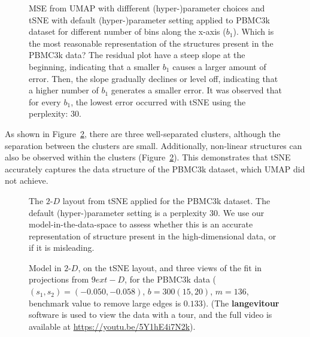 \documentclass[
  12pt]{article}
\begin{document}
\begin{figure}[H]


\caption{\label{fig-pbmc-mse}MSE from UMAP with diffferent
(hyper-)parameter choices and tSNE with default (hyper-)parameter
setting applied to PBMC3k dataset for different number of bins along the
x-axis (\(b_1\)). Which is the most reasonable representation of the
structures present in the PBMC3k data? The residual plot have a steep
slope at the beginning, indicating that a smaller \(b_1\) causes a
larger amount of error. Then, the slope gradually declines or level off,
indicating that a higher number of \(b_1\) generates a smaller error. It
was observed that for every \(b_1\), the lowest error occurred with tSNE
using the perplexity: \(30\).}

\end{figure}%

As shown in Figure~\ref{fig-tsne-suggest}, there are three
well-separated clusters, although the separation between the clusters
are small. Additionally, non-linear structures can also be observed
within the clusters (Figure~\ref{fig-tsne-suggest}). This demonstrates
that tSNE accurately captures the data structure of the PBMC3k dataset,
which UMAP did not achieve.

\begin{figure}[H]


\caption{\label{fig-tsne-suggest}The \(2\text{-}D\) layout from tSNE
applied for the PBMC3k dataset. The default (hyper-)parameter setting is
a perplexity \(30\). We use our model-in-the-data-space to assess
whether this is an accurate representation of structure present in the
high-dimensional data, or if it is misleading.}

\end{figure}%

\begin{figure}[H]


\caption{\label{fig-pbmc2-sc}Model in \(2\text{-}D\), on the tSNE
layout, and three views of the fit in projections from \(9  ext{-}D\),
for the PBMC3k data (\((s_1,  s_2) = (-0.050,  -0.058)\),
\(b = 300   (15,  20)\), \(m = 136\), benchmark value to remove large
edges is \(0.133\)). (The \textbf{langevitour} software is used to view
the data with a tour, and the full video is available at
\url{https://youtu.be/5Y1hE4i7N2k}).}

\end{figure}%
\end{document}

